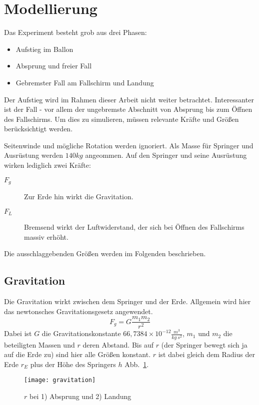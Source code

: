 \section{Modellierung}

Das Experiment besteht grob aus drei Phasen:
\begin{itemize}
  \item Aufstieg im Ballon
  \item Absprung und freier Fall
  \item Gebremster Fall am Fallschirm und Landung
\end{itemize}
Der Aufstieg wird im Rahmen dieser Arbeit nicht weiter betrachtet.
Interessanter ist der Fall - vor allem der ungebremste Abschnitt von Absprung bis zum Öffnen des Fallschirms.
Um dies zu simulieren, müssen relevante Kräfte und Größen berücksichtigt werden. %

Seitenwinde und mögliche Rotation werden ignoriert.
Als Masse für Springer und Ausrüstung werden $140kg$ angeommen.
Auf den Springer und seine Ausrüstung wirken lediglich zwei Kräfte:
\begin{description}
  \item[$F_g$] Zur Erde hin wirkt die Gravitation.
  \item[$F_L$] Bremsend wirkt der Luftwiderstand, der sich bei Öffnen des Fallschirms massiv erhöht.
\end{description}

Die ausschlaggebenden Größen werden im Folgenden beschrieben.

\subsection{Gravitation}
Die Gravitation wirkt zwischen dem Springer und der Erde.
Allgemein wird hier das newtonsches Gravitationsgesetz angewendet.
\begin{equation}
F_g=G \frac{m_1 m_2}{r^2}
\end{equation}
Dabei ist $G$ die Gravitationskonstante $66,7384\times 10^{-12} \frac{m^3}{kg\ s^2}$, $m_1$ und $m_2$ die beteiligten Massen und $r$ deren Abstand.
Bis auf $r$ (der Springer bewegt sich ja auf die Erde zu) sind hier alle Größen konstant.
$r$ ist dabei gleich dem Radius der Erde $r_E$ plus der Höhe des Springers $h$ \vgl Abb.~\ref{fig:gravitation}.
\begin{figure}[h]
  \centering
  \texttt{[image: gravitation]}
  \caption{$r$ bei 1) Absprung und 2) Landung}
  \label{fig:gravitation}
\end{figure}


